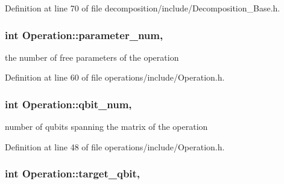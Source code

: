 Definition at line 70 of file decomposition/include/\+Decomposition\+\_\+\+Base.\+h.

\subsubsection[{\texorpdfstring{parameter\+\_\+num}{parameter_num}}]{\setlength{\rightskip}{0pt plus 5cm}int Operation\+::parameter\+\_\+num\hspace{0.3cm}{\ttfamily [protected]}, {\ttfamily [inherited]}}\hypertarget{class_operation_aa57505afe5b5ec27f6d053044b86e043}{}\label{class_operation_aa57505afe5b5ec27f6d053044b86e043}


the number of free parameters of the operation 



Definition at line 60 of file operations/include/\+Operation.\+h.

\subsubsection[{\texorpdfstring{qbit\+\_\+num}{qbit_num}}]{\setlength{\rightskip}{0pt plus 5cm}int Operation\+::qbit\+\_\+num\hspace{0.3cm}{\ttfamily [protected]}, {\ttfamily [inherited]}}\hypertarget{class_operation_aecd5fbf1dd4ea532b2e58471ff8bad69}{}\label{class_operation_aecd5fbf1dd4ea532b2e58471ff8bad69}


number of qubits spanning the matrix of the operation 



Definition at line 48 of file operations/include/\+Operation.\+h.

\subsubsection[{\texorpdfstring{target\+\_\+qbit}{target_qbit}}]{\setlength{\rightskip}{0pt plus 5cm}int Operation\+::target\+\_\+qbit\hspace{0.3cm}{\ttfamily [protected]}, {\ttfamily [inherited]}}\hypertarget{class_operation_a3e489b72c124b494777c71b1646bb1e9}{}\label{class_operation_a3e489b72c124b494777c71b1646bb1e9}


